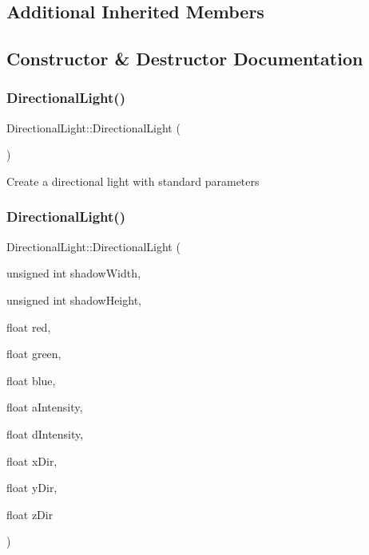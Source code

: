 \subsection*{Additional Inherited Members}


\subsection{Constructor \& Destructor Documentation}
\mbox{\label{class_directional_light_a949b877ae041b9818f47eb812d80fa1b}} 
\subsubsection{\texorpdfstring{DirectionalLight()}{DirectionalLight()}\hspace{0.1cm}{\footnotesize\ttfamily [1/2]}}
{\footnotesize\ttfamily Directional\+Light\+::\+Directional\+Light (\begin{DoxyParamCaption}{ }\end{DoxyParamCaption})}

Create a directional light with standard parameters \mbox{\label{class_directional_light_a2b2942986587b840fc76ae9da9742cb2}} 
\subsubsection{\texorpdfstring{DirectionalLight()}{DirectionalLight()}\hspace{0.1cm}{\footnotesize\ttfamily [2/2]}}
{\footnotesize\ttfamily Directional\+Light\+::\+Directional\+Light (\begin{DoxyParamCaption}\item[{unsigned int}]{shadow\+Width,  }\item[{unsigned int}]{shadow\+Height,  }\item[{float}]{red,  }\item[{float}]{green,  }\item[{float}]{blue,  }\item[{float}]{a\+Intensity,  }\item[{float}]{d\+Intensity,  }\item[{float}]{x\+Dir,  }\item[{float}]{y\+Dir,  }\item[{float}]{z\+Dir }\end{DoxyParamCaption})}

